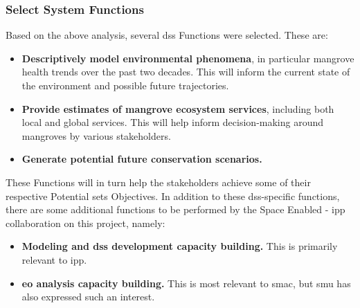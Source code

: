 %
%
%
%
%
%
%
%

\subsubsection{Select System Functions} \label{sec:rio-saf-function-result}

Based on the above analysis, several \ac{dss} Functions were selected. These are:

\begin{itemize}[itemsep=0pt,parsep=0pt]
    \item{\textbf{Descriptively model environmental phenomena}, in particular mangrove health trends over the past two decades. This will inform the current state of the environment and possible future trajectories.}
    \item{\textbf{Provide estimates of mangrove ecosystem services}, including both local and global services. This will help inform decision-making around mangroves by various stakeholders.}
    \item{\textbf{Generate potential future conservation scenarios.}}
\end{itemize}

These Functions will in turn help the stakeholders achieve some of their respective Potential \ac{sets} Objectives. In addition to these \ac{dss}-specific functions, there are some additional functions to be performed by the Space Enabled - \ac{ipp} collaboration on this project, namely:

\begin{itemize}[itemsep=0pt,parsep=0pt]
    \item{\textbf{Modeling and \ac{dss} development capacity building.} This is primarily relevant to \ac{ipp}.}
    \item{\textbf{\ac{eo} analysis capacity building.} This is most relevant to \ac{smac}, but \ac{smu} has also expressed such an interest.}
\end{itemize}


